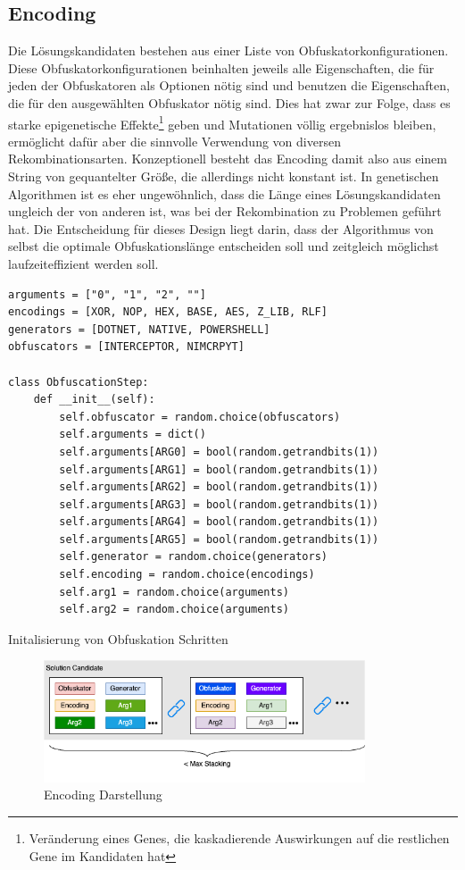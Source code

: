 \subsection{Encoding}
Die Lösungskandidaten bestehen aus einer Liste von Obfuskatorkonfigurationen. Diese Obfuskatorkonfigurationen beinhalten jeweils alle Eigenschaften, die für jeden der Obfuskatoren als Optionen nötig sind und benutzen die Eigenschaften, die für den ausgewählten Obfuskator nötig sind. Dies hat zwar zur Folge, dass es starke epigenetische Effekte\footnote{Veränderung eines Genes, die kaskadierende Auswirkungen auf die restlichen Gene im Kandidaten hat} geben und Mutationen völlig ergebnislos bleiben, ermöglicht dafür aber die sinnvolle Verwendung von diversen Rekombinationsarten. Konzeptionell besteht das Encoding damit also aus einem String von gequantelter Größe, die allerdings nicht konstant ist. 
In genetischen Algorithmen ist es eher ungewöhnlich, dass die Länge eines Lösungskandidaten ungleich der von anderen ist, was bei der Rekombination zu Problemen geführt hat. Die Entscheidung für dieses Design liegt darin, dass der Algorithmus von selbst die optimale Obfuskationslänge entscheiden soll und zeitgleich möglichst laufzeiteffizient werden soll.
\begin{listing}
    \begin{verbatim}
arguments = ["0", "1", "2", ""]
encodings = [XOR, NOP, HEX, BASE, AES, Z_LIB, RLF]
generators = [DOTNET, NATIVE, POWERSHELL]
obfuscators = [INTERCEPTOR, NIMCRPYT]

class ObfuscationStep:
    def __init__(self):
        self.obfuscator = random.choice(obfuscators)
        self.arguments = dict() 
        self.arguments[ARG0] = bool(random.getrandbits(1))
        self.arguments[ARG1] = bool(random.getrandbits(1))
        self.arguments[ARG2] = bool(random.getrandbits(1))
        self.arguments[ARG3] = bool(random.getrandbits(1))
        self.arguments[ARG4] = bool(random.getrandbits(1))
        self.arguments[ARG5] = bool(random.getrandbits(1))
        self.generator = random.choice(generators)
        self.encoding = random.choice(encodings)
        self.arg1 = random.choice(arguments) 
        self.arg2 = random.choice(arguments) 
    \end{verbatim}
    \caption{Initalisierung von Obfuskation Schritten}
    \label{code:Obfuskation_Step}
\end{listing}
\begin{figure}[h]
    \centering
    \includegraphics[width=0.85\textwidth]{gfx/Abbildungen/Encoding Diagram.png}
    \caption{Encoding Darstellung}
    \label{fig:encoding}
\end{figure}

